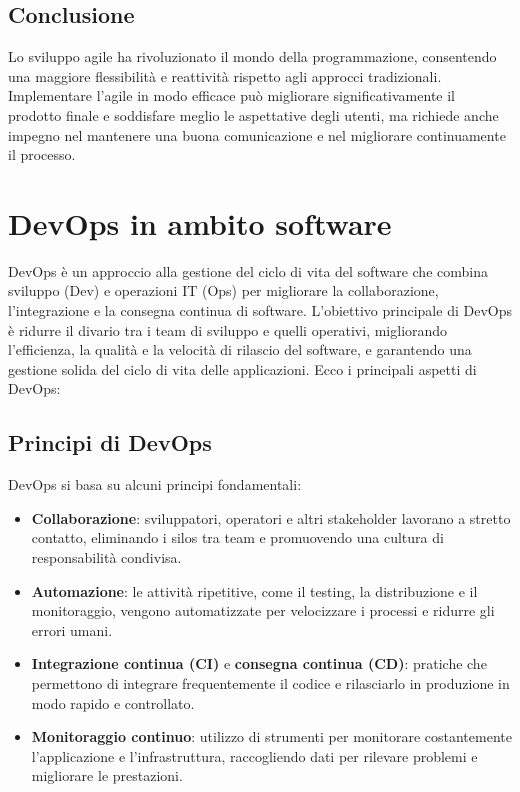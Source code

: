 \documentclass{article}
\begin{document}
\subsection{Conclusione}
Lo sviluppo agile ha rivoluzionato il mondo della programmazione, consentendo una maggiore flessibilità e reattività rispetto agli approcci tradizionali. Implementare l'agile in modo efficace può migliorare significativamente il prodotto finale e soddisfare meglio le aspettative degli utenti, ma richiede anche impegno nel mantenere una buona comunicazione e nel migliorare continuamente il processo.

\section{DevOps in ambito software}

DevOps è un approccio alla gestione del ciclo di vita del software che combina sviluppo (Dev) e operazioni IT (Ops) per migliorare la collaborazione, l'integrazione e la consegna continua di software. L'obiettivo principale di DevOps è ridurre il divario tra i team di sviluppo e quelli operativi, migliorando l'efficienza, la qualità e la velocità di rilascio del software, e garantendo una gestione solida del ciclo di vita delle applicazioni. Ecco i principali aspetti di DevOps:

\subsection{Principi di DevOps}
DevOps si basa su alcuni principi fondamentali:
\begin{itemize}
    \item \textbf{Collaborazione}: sviluppatori, operatori e altri stakeholder lavorano a stretto contatto, eliminando i silos tra team e promuovendo una cultura di responsabilità condivisa.
    \item \textbf{Automazione}: le attività ripetitive, come il testing, la distribuzione e il monitoraggio, vengono automatizzate per velocizzare i processi e ridurre gli errori umani.
    \item \textbf{Integrazione continua (CI)} e \textbf{consegna continua (CD)}: pratiche che permettono di integrare frequentemente il codice e rilasciarlo in produzione in modo rapido e controllato.
    \item \textbf{Monitoraggio continuo}: utilizzo di strumenti per monitorare costantemente l'applicazione e l'infrastruttura, raccogliendo dati per rilevare problemi e migliorare le prestazioni.
\end{itemize}
\end{document}
